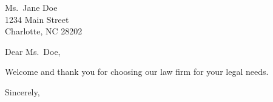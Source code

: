 \documentclass[12pt]{letter}
\begin{document}
	\begin{letter}{Ms.\ Jane Doe\\ 1234 Main Street \\ Charlotte, NC  28202}
    	\opening{Dear Ms.\ Doe,}
	\thispagestyle{fancy}
	Welcome and thank you for choosing our law firm for your legal needs.
	
	\closing{Sincerely,}

	\end{letter}
	
\end{document}
